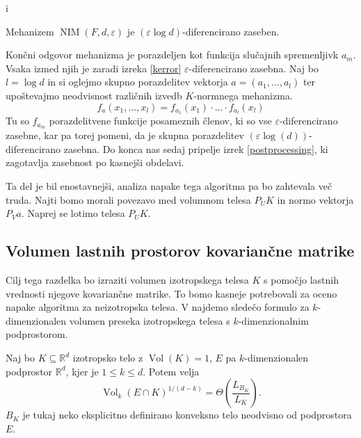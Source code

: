 i\documentclass[mat1]{fmfdelo}
\newcommand{\R}{\mathbb R}
\DeclareMathOperator{\Vol}{Vol}
\DeclareMathOperator{\NIM}{NIM}
\begin{document}
\begin{lema} \label{nimdiff}
    Mehanizem $\NIM(F,d,\varepsilon)$ je $(\varepsilon \log d)$-diferencirano zaseben.
\end{lema}
\begin{dokaz}
    Končni odgovor mehanizma je porazdeljen kot funkcija slučajnih spremenljivk $a_m$. Vsaka izmed njih je zaradi izreka \ref{kerror} $\varepsilon$-diferencirano zasebna.
    Naj bo $l = \log d$ in si oglejmo skupno porazdelitev vektorja $a=(a_1, \dots, a_l)$ ter upoštevajmo neodvisnost različnih izvedb $K$-normnega mehanizma.
    \begin{equation*}
        f_a(x_1, \dots, x_l) = f_{a_1}(x_1) \cdot \dots \cdot f_{a_l}(x_l)
    \end{equation*}
    Tu so $f_{a_m}$ porazdelitvene funkcije posameznih členov, ki so vse $\varepsilon$-diferencirano zasebne, kar pa torej pomeni, da je skupna porazdelitev $(\varepsilon \log(d))$-diferencirano zasebna. Do konca nas sedaj pripelje izrek \ref{postprocessing}, ki zagotavlja zasebnost po kasnejši obdelavi.
\end{dokaz}

Ta del je bil enostavnejši, analiza napake tega algoritma pa bo zahtevala več truda. Najti bomo morali povezavo med volumnom telesa $P_UK$ in normo vektorja $P_Va$. Naprej se lotimo telesa $P_UK$.

\subsection{\texorpdfstring{Volumen lastnih prostorov kovariančne matrike}{Volumen lastnih prostorov kovariancne matrike}}

Cilj tega razdelka bo izraziti volumen izotropskega telesa $K$ s pomočjo lastnih vrednosti njegove kovariančne matrike. To bomo kasneje potrebovali za oceno napake algoritma za neizotropska telesa. V \cite{milman} najdemo sledečo formulo za $k$-dimenzionalen volumen preseka izotropskega telesa s $k$-dimenzionalnim podprostorom.

\begin{izrek}
    Naj bo $K \subseteq \R^d$ izotropsko telo z $\Vol(K)=1$, $E$ pa $k$-dimenzionalen podprostor $\R^d$, kjer je $1 \leq k \leq d$. Potem velja
    \begin{equation*}
        \Vol_k(E \cap K)^{1/(d-k)} = \Theta\left(\frac{L_{B_K}}{L_{K}}\right).
    \end{equation*}
    $B_K$ je tukaj neko eksplicitno definirano konveksno telo neodvisno od podprostora $E$.
\end{izrek}
\end{document}

